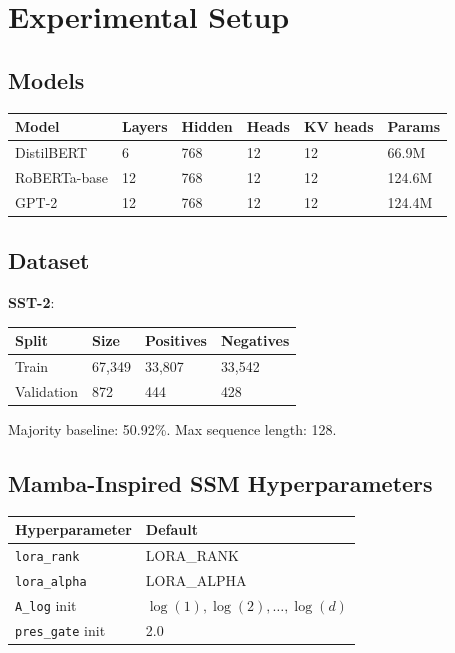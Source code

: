\section{Experimental Setup}

\subsection{Models}

\begin{table}[H]
\centering
\small
\begin{tabular}{llllll}
\toprule
\textbf{Model} & \textbf{Layers} & \textbf{Hidden} & \textbf{Heads} & \textbf{KV heads} & \textbf{Params} \\
\midrule
DistilBERT & 6 & 768 & 12 & 12 & 66.9M \\
RoBERTa-base & 12 & 768 & 12 & 12 & 124.6M \\
GPT-2 & 12 & 768 & 12 & 12 & 124.4M \\
\bottomrule
\end{tabular}
\end{table}

\subsection{Dataset}

\textbf{SST-2}:

\begin{table}[H]
\centering
\small
\begin{tabular}{llll}
\toprule
\textbf{Split} & \textbf{Size} & \textbf{Positives} & \textbf{Negatives} \\
\midrule
Train & 67,349 & 33,807 & 33,542 \\
Validation & 872 & 444 & 428 \\
\bottomrule
\end{tabular}
\end{table}

Majority baseline: 50.92\%. Max sequence length: 128.

\subsection{Mamba-Inspired SSM Hyperparameters}

\begin{table}[H]
\centering
\small
\begin{tabular}{ll}
\toprule
\textbf{Hyperparameter} & \textbf{Default} \\
\midrule
\texttt{lora\_rank} & {{LORA\_RANK}} \\
\texttt{lora\_alpha} & {{LORA\_ALPHA}} \\
\texttt{A\_log} init & $\log(1), \log(2), \ldots, \log(d)$ \\
\texttt{pres\_gate} init & 2.0 \\
\bottomrule
\end{tabular}
\end{table}

